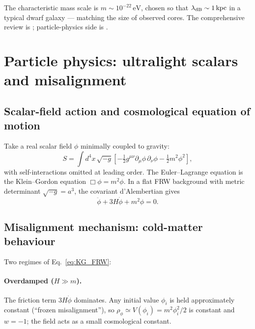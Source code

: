 \documentclass[12pt]{article}
\newcommand{\lambdadB}{\lambda_{\rm dB}}
\newcommand{\eV}{\,\mathrm{eV}}
\begin{document}
The characteristic mass scale is $m\sim 10^{-22}\eV$, chosen so that
$\lambdadB\sim 1\,{\rm kpc}$ in a typical dwarf galaxy --- matching
the size of observed cores.  The comprehensive review is
\citet{Hui2017}; particle-physics side is \citet{Marsh2016}.

\section{Particle physics: ultralight scalars and misalignment}
\label{sec:particle}

\subsection{Scalar-field action and cosmological equation of motion}

Take a real scalar field $\phi$ minimally coupled to gravity:
%
\begin{equation}
  S = \int d^4x\,\sqrt{-g}\left[
       -\tfrac{1}{2}g^{\mu\nu}\partial_\mu\phi\,\partial_\nu\phi
       -\tfrac{1}{2}m^2\phi^2
      \right],
  \label{eq:scalar_action}
\end{equation}
%
with self-interactions omitted at leading order.  The
Euler--Lagrange equation is the Klein--Gordon equation
$\Box\phi = m^2\phi$.  In a flat FRW background with metric
determinant $\sqrt{-g} = a^3$, the covariant d'Alembertian gives
%
\begin{equation}
  \ddot\phi + 3H\dot\phi + m^2\phi = 0.
  \label{eq:KG_FRW}
\end{equation}

\subsection{Misalignment mechanism: cold-matter behaviour}

Two regimes of Eq.~\eqref{eq:KG_FRW}:

\paragraph{Overdamped ($H\gg m$).}  The friction term $3H\dot\phi$
dominates.  Any initial value $\phi_i$ is held approximately constant
(``frozen misalignment''), so $\rho_\phi\simeq V(\phi_i) = m^2\phi_i^2/2$
is constant and $w = -1$; the field acts as a small cosmological
constant.
\end{document}
